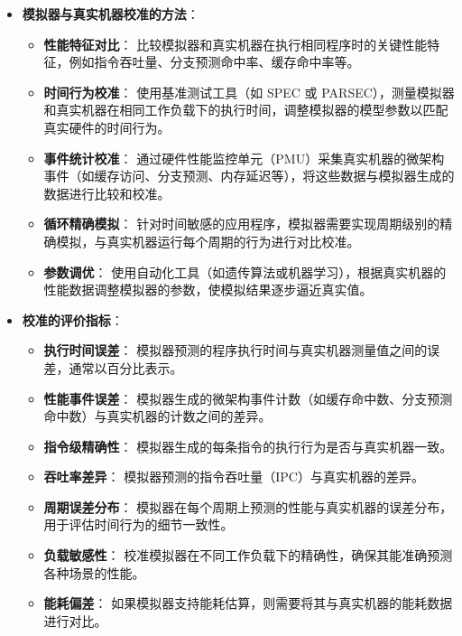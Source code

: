 \documentclass[UTF8]{report}
\begin{document}
\begin{itemize}
    \item \textbf{模拟器与真实机器校准的方法}：
    \begin{itemize}
        \item \textbf{性能特征对比}：
        比较模拟器和真实机器在执行相同程序时的关键性能特征，例如指令吞吐量、分支预测命中率、缓存命中率等。
        \item \textbf{时间行为校准}：
        使用基准测试工具（如 SPEC 或 PARSEC），测量模拟器和真实机器在相同工作负载下的执行时间，调整模拟器的模型参数以匹配真实硬件的时间行为。
        \item \textbf{事件统计校准}：
        通过硬件性能监控单元（PMU）采集真实机器的微架构事件（如缓存访问、分支预测、内存延迟等），将这些数据与模拟器生成的数据进行比较和校准。
        \item \textbf{循环精确模拟}：
        针对时间敏感的应用程序，模拟器需要实现周期级别的精确模拟，与真实机器运行每个周期的行为进行对比校准。
        \item \textbf{参数调优}：
        使用自动化工具（如遗传算法或机器学习），根据真实机器的性能数据调整模拟器的参数，使模拟结果逐步逼近真实值。
    \end{itemize}

    \item \textbf{校准的评价指标}：
    \begin{itemize}
        \item \textbf{执行时间误差}：
        模拟器预测的程序执行时间与真实机器测量值之间的误差，通常以百分比表示。
        \item \textbf{性能事件误差}：
        模拟器生成的微架构事件计数（如缓存命中数、分支预测命中数）与真实机器的计数之间的差异。
        \item \textbf{指令级精确性}：
        模拟器生成的每条指令的执行行为是否与真实机器一致。
        \item \textbf{吞吐率差异}：
        模拟器预测的指令吞吐量（IPC）与真实机器的差异。
        \item \textbf{周期误差分布}：
        模拟器在每个周期上预测的性能与真实机器的误差分布，用于评估时间行为的细节一致性。
        \item \textbf{负载敏感性}：
        校准模拟器在不同工作负载下的精确性，确保其能准确预测各种场景的性能。
        \item \textbf{能耗偏差}：
        如果模拟器支持能耗估算，则需要将其与真实机器的能耗数据进行对比。
    \end{itemize}
\end{itemize}
\end{document}
